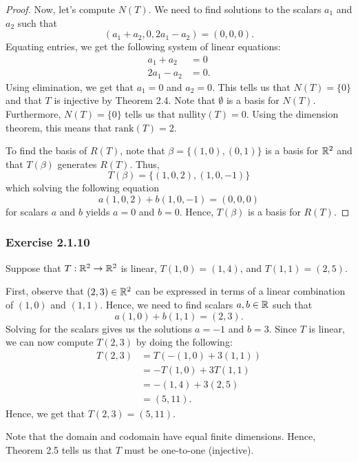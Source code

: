 \begin{proof}
    Now, let's compute \( N(T) \). We need to find solutions to the scalars \( {a}_{1}  \) and \( {a}_{2} \) such that 
    \[  ({a}_{1} + {a}_{2}, 0, {2a}_{1} -{a}_{2}) = (0,0,0). \]
    Equating entries, we get the following system of linear equations:
    \begin{align*}
        {a}_{1} + {a}_{2} &= 0 \\ 
        {2a}_{1} - {a}_{2} &= 0.
    \end{align*}
    Using elimination, we get that \( {a}_{1} = 0  \) and \( {a}_{2} = 0  \). This tells us that \( N(T) = \{  0  \}  \) and that \( T \) is injective by Theorem 2.4. Note that \( \emptyset \) is a basis for \( N(T) \). Furthermore, \( N(T) = \{ 0  \}   \) tells us that \( \text{nullity}(T) = 0  \). Using the dimension theorem, this means that \( \text{rank}(T) = 2  \). 

    To find the basis of \( R(T) \), note that \( \beta = \{ (1,0), (0,1) \}  \) is a basis for \( \mathbb{R}^{2} \) and that \( T(\beta)  \) generates \( R(T) \). Thus, 
    \[  T(\beta) = \{  (1,0,2), (1,0,-1) \} \]
    which solving the following equation
    \[  a(1,0,2) + b(1,0,-1) = (0,0,0) \]
    for scalars \( a  \) and \( b \) yields \( a = 0  \) and \( b = 0  \). Hence, \( T(\beta) \) is a basis for \( R(T) \).
    
\end{proof}

\subsubsection{Exercise 2.1.10} Suppose that \( T: \mathbb{R}^{2} \to \mathbb{R}^{2} \) is linear, \( T(1,0) = (1,4) \), and \( T(1,1) = (2,5) \).
\begin{solution}
    First, observe that \( (2,3) \in \mathbb{R}^{2} \) can be expressed in terms of a linear combination of \( (1,0) \) and \( (1,1) \). Hence, we need to find scalars \( a,b \in \mathbb{R}  \) such that
    \[  a(1,0) + b(1,1) = (2,3). \]
    Solving for the scalars gives us the solutions \( a = - 1  \) and \( b = 3  \). Since \( T  \) is linear, we can now compute \( T(2,3)  \) by doing the following:
    \begin{align*}
        T(2,3) &= T(-(1,0) + 3(1,1)) \\
               &= -T(1,0) + 3 T(1,1) \\
               &= - (1,4) + 3(2,5) \\
               &= (5,11).
    \end{align*} 
    Hence, we get that \( T(2,3) = (5,11) \). 

    Note that the domain and codomain have equal finite dimensions. Hence, Theorem 2.5 tells us that \( T  \) must be one-to-one (injective).
\end{solution} 

